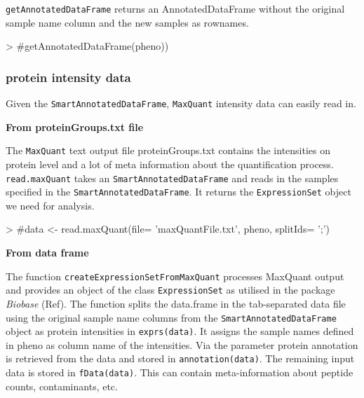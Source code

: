 \documentclass[a4paper,11pt]{article}
\newcommand{\Robject}[1]{{\texttt{#1}}}
\newcommand{\Rfunction}[1]{{\texttt{#1}}}
\newcommand{\Rpackage}[1]{\textit{#1}}
\begin{document}
\Rfunction{getAnnotatedDataFrame} returns an AnnotatedDataFrame without the original sample name column and the new samples as rownames. 
\begin{Schunk}
\begin{Sinput}
> #getAnnotatedDataFrame(pheno))
\end{Sinput}
\end{Schunk}


\subsubsection{protein intensity data}

Given the \Robject{SmartAnnotatedDataFrame}, \texttt{MaxQuant} intensity data can easily read in.  

\textbf{From proteinGroups.txt file}

The \texttt{MaxQuant} text output file proteinGroups.txt contains the intensities on protein level and a lot of meta information about the quantification process. \Rfunction{read.maxQuant} takes an \Robject{SmartAnnotatedDataFrame} and reads in the samples specified in the \Robject{SmartAnnotatedDataFrame}. It returns the \Robject{ExpressionSet} object we need for analysis.

\begin{Schunk}
\begin{Sinput}
> #data <- read.maxQuant(file= 'maxQuantFile.txt', pheno, splitIds= ';')
\end{Sinput}
\end{Schunk}

\textbf{From data frame}

The function \Rfunction{createExpressionSetFromMaxQuant} processes MaxQuant output and provides an object of the class \Robject{ExpressionSet} as utilised in the package \Rpackage{Biobase} (Ref).
The function splits the data.frame in the tab-separated data file using the original sample name columns from the 
\Robject{SmartAnnotatedDataFrame} object as protein intensities in \Rfunction{exprs(data)}. It assigns the sample names defined in pheno as column name of the intensities. Via the parameter protein annotation is retrieved from the data and stored in \Rfunction{annotation(data)}. The remaining input data is stored in \Rfunction{fData(data)}. This can contain meta-information about peptide 
counts, contaminants, etc. 
\end{document}
